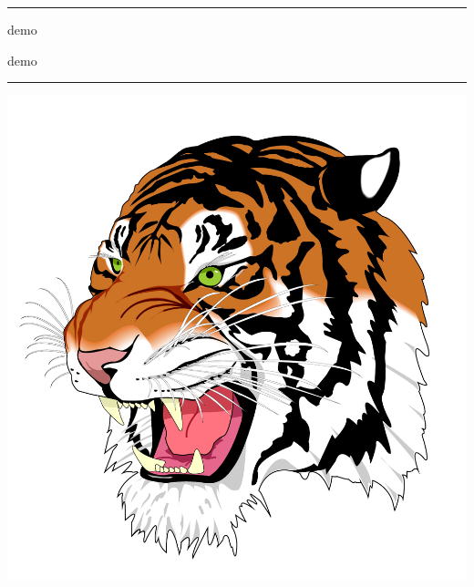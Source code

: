 \documentclass[a4paper,demo]{article}
\begin{document}
\hrule
\begin{description}
  \Large
  \item[graphicx:] demo
  \item[pdfpages:] demo
\end{description}
\hrule

\tableofcontents
\includegraphics[scale=.4]{dum/tiger.pdf}


\end{document}
